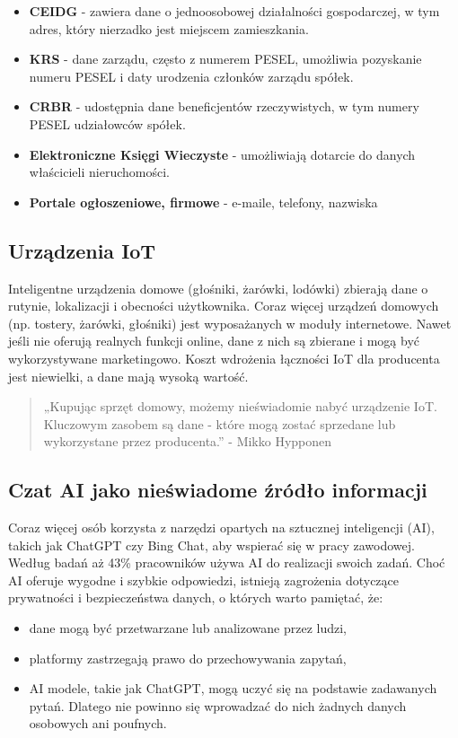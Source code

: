 \begin{itemize}
  \item \textbf{CEIDG} - zawiera dane o jednoosobowej działalności gospodarczej, w tym adres, który nierzadko jest miejscem zamieszkania. 
  \item \textbf{KRS} - dane zarządu, często z numerem PESEL, umożliwia pozyskanie numeru PESEL i daty urodzenia członków zarządu spółek.
  \item \textbf{CRBR} - udostępnia dane beneficjentów rzeczywistych, w tym numery PESEL udziałowców spółek.
  \item \textbf{Elektroniczne Księgi Wieczyste} - umożliwiają dotarcie do danych właścicieli nieruchomości.
  \item \textbf{Portale ogłoszeniowe, firmowe} - e-maile, telefony, nazwiska
\end{itemize}

\subsection{Urządzenia IoT}

Inteligentne urządzenia domowe (głośniki, żarówki, lodówki) zbierają dane o rutynie, lokalizacji i obecności użytkownika. Coraz więcej urządzeń domowych (np. tostery, żarówki, głośniki) jest wyposażanych w moduły internetowe. Nawet jeśli nie oferują realnych funkcji online, dane z nich są zbierane i mogą być wykorzystywane marketingowo. Koszt wdrożenia łączności IoT dla producenta jest niewielki, a dane mają wysoką wartość.

\begin{quote}
„Kupując sprzęt domowy, możemy nieświadomie nabyć urządzenie IoT. Kluczowym zasobem są dane - które mogą zostać sprzedane lub wykorzystane przez producenta.” - Mikko Hypponen
\end{quote}

\subsection{Czat AI jako nieświadome źródło informacji \cite{ai}}
Coraz więcej osób korzysta z narzędzi opartych na sztucznej inteligencji (AI), takich jak ChatGPT czy Bing Chat, aby wspierać się w pracy zawodowej. Według badań aż 43\% pracowników używa AI do realizacji swoich zadań. Choć AI oferuje wygodne i szybkie odpowiedzi, istnieją zagrożenia dotyczące prywatności i bezpieczeństwa danych, o których warto pamiętać, że:

\begin{itemize}
  \item dane mogą być przetwarzane lub analizowane przez ludzi,
  \item platformy zastrzegają prawo do przechowywania zapytań,
  \item AI modele, takie jak ChatGPT, mogą uczyć się na podstawie zadawanych pytań. Dlatego nie powinno się wprowadzać do nich żadnych danych osobowych ani poufnych.
\end{itemize}

